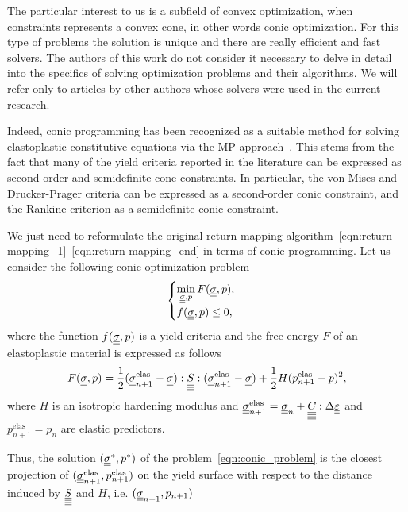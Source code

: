 \documentclass[12pt]{article}
\begin{document}
The particular interest to us is a subfield of convex optimization, when constraints represents a convex cone, in other words conic optimization. For this type of problems the solution is unique and there are really efficient and fast solvers. The authors of this work do not consider it necessary to delve in detail into the specifics of solving optimization problems and their algorithms. We will refer only to articles by other authors whose solvers were used in the current research.

Indeed, conic programming has been recognized as a suitable method for solving elastoplastic constitutive equations via the MP approach~\parencite{BRUNO2020724}. This stems from the fact that many of the yield criteria reported in the literature can be expressed as second-order and semidefinite cone constraints. In particular, the von Mises and Drucker-Prager criteria can be expressed as a second-order conic constraint, and the Rankine criterion as a semidefinite conic constraint. 

We just need to reformulate the original return-mapping algorithm~\eqref{eqn:return-mapping_1}--\eqref{eqn:return-mapping_end} in terms of conic programming. Let us consider the following conic optimization problem
\begin{equation}
    \label{eqn:conic_problem}
    \begin{cases}
        \min\limits_{\underline{\underline{\sigma}}, p} F(\underline{\underline{\sigma}}, p), \\
        f(\underline{\underline{\sigma}}, p) \leq 0,
    \end{cases}
\end{equation}
where the function $f(\underline{\underline{\sigma}}, p)$ is a yield criteria and the free energy $F$ of an elastoplastic material is expressed as follows
\begin{equation}
    F(\underline{\underline{\sigma}}, p) = \frac{1}{2}(\underline{\underline{\sigma}}_{n+1}^{\text{elas}} - \underline{\underline{\sigma}}) : \underline{\underline{\underline{\underline{S}}}} : (\underline{\underline{\sigma}}_{n+1}^{\text{elas}} - \underline{\underline{\sigma}}) + \frac{1}{2}H(p_{n+1}^\text{elas} - p)^2,
\end{equation}
where $H$ is an isotropic hardening modulus and $\underline{\underline{\sigma}}_{n+1}^{\text{elas}} = \underline{\underline{\sigma}}_n + \underline{\underline{\underline{\underline{C_{}}}}}:\Delta\underline{\underline{\varepsilon}}$ and $p^\text{elas}_{n+1} = p_n$ are elastic predictors.

Thus, the solution $(\underline{\underline{\sigma}}^*, p^*)$ of the problem~\eqref{eqn:conic_problem} is the closest projection of $(\underline{\underline{\sigma}}_{n+1}^{\text{elas}}, p_{n+1}^\text{elas})$ on the yield surface with respect to the distance induced by $\underline{\underline{\underline{\underline{S}}}}$ and $H$, i.e. $(\underline{\underline{\sigma}}_{n+1}, p_{n+1})$ 
\end{document}
